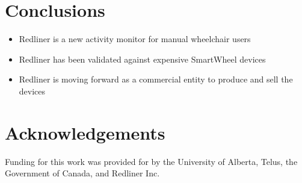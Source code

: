 \documentclass[a0,landscape]{a0poster}
\begin{document}
\begin{multicols*}{3}
\section*{Conclusions}
\begin{itemize}
    \item Redliner is a new activity monitor for manual wheelchair users
    \item Redliner has been validated against expensive SmartWheel devices
    \item Redliner is moving forward as a commercial entity to produce and sell the devices
\end{itemize}

\nocite{*} %

\section*{Acknowledgements}
Funding for this work was provided for by the University of Alberta, Telus, the Government of Canada, and Redliner Inc.

\end{multicols*}
\end{document}
